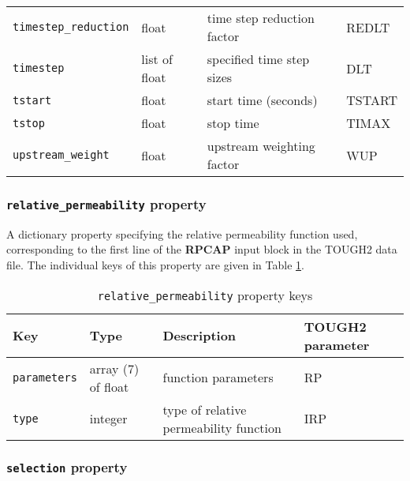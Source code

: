 \begin{sidewaystable}
\begin{center}
\begin{tabular}{|l|l|l|l|}
      \texttt{timestep\_reduction} & float & time step reduction factor & REDLT\\
      \texttt{timestep} & list of float & specified time step sizes & DLT\\
      \texttt{tstart} & float & start time (seconds) & TSTART\\
      \texttt{tstop} & float & stop time & TIMAX\\
      \texttt{upstream\_weight} & float & upstream weighting factor & WUP\\
      \hline
    \end{tabular}
    \caption{\texttt{parameter} property keys}
    \label{tb:parameter}
  \end{center}
\end{sidewaystable}

\begin{snugshade}
\subsubsection{\texttt{relative\_permeability} property}
\end{snugshade}
\label{sec:t2data:relative_permeability}

A dictionary property specifying the relative permeability function used, corresponding to the first line of the \textbf{RPCAP} input block in the TOUGH2 data file.  The individual keys of this property are given in Table \ref{tb:relativepermeability}.

\begin{table}
  \begin{center}
    \begin{tabular}{|l|l|l|p{20mm}|}
      \hline
      \textbf{Key} & \textbf{Type} & \textbf{Description} & \textbf{TOUGH2 parameter}\\
      \hline
      \texttt{parameters} & array (7) of float & function parameters & RP\\
      \texttt{type} & integer & type of relative permeability function & IRP\\
      \hline
    \end{tabular}
    \caption{\texttt{relative\_permeability} property keys}
    \label{tb:relativepermeability}
  \end{center}
\end{table}

\begin{snugshade}
\subsubsection{\texttt{selection} property}
\end{snugshade}
\label{sec:t2data:selection}

